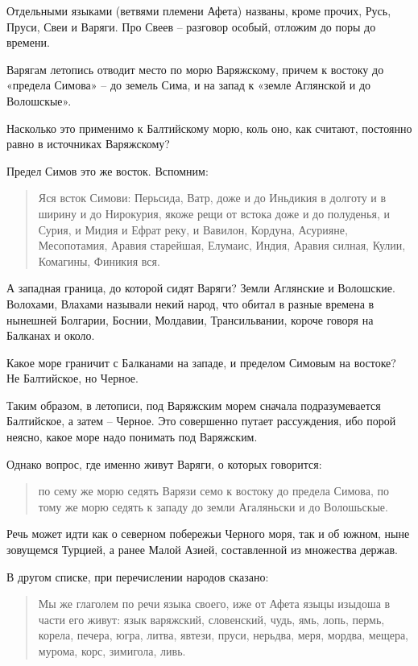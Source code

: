 Отдельными языками (ветвями племени Афета) названы, кроме прочих, Русь, Пруси, Свеи и Варяги. Про Свеев – разговор особый, отложим до поры до времени. 

Варягам летопись отводит место по морю Варяжскому, причем к востоку до «предела Симова» – до земель Сима, и на запад к «земле Аглянской и до Волошскые».

Насколько это применимо к Балтийскому морю, коль оно, как считают, постоянно равно в источниках Варяжскому?

Предел Симов это же восток. Вспомним:

\begin{quotation}
Яся всток Симови: Перьсида, Ватр, доже и до Иньдикия в долготу и в ширину и до Нирокурия, якоже рещи от встока доже и до полуденья, и Сурия, и Мидия и Ефрат реку, и Вавилон, Кордуна, Асурияне, Месопотамия, Аравия старейшая, Елумаис, Индия, Аравия силная, Кулии, Комагины, Финикия вся.
\end{quotation}

А западная граница, до которой сидят Варяги? Земли Аглянские и Волошские. Волохами, Влахами называли некий народ, что обитал в разные времена в нынешней Болгарии, Боснии, Молдавии, Трансильвании, короче говоря на Балканах и около.

Какое море граничит с Балканами на западе, и пределом Симовым на востоке? Не Балтийское, но Черное.

Таким образом, в летописи, под Варяжским морем сначала подразумевается Балтийское, а затем – Черное. Это совершенно путает рассуждения, ибо порой неясно, какое море надо понимать под Варяжским.

Однако вопрос, где именно живут Варяги, о которых говорится:

\begin{quotation}
по сему же морю седять Варязи семо к востоку до предела Симова, по тому же морю седять к западу до земли Агаляньски и до Волошьскые.
\end{quotation}

Речь может идти как о северном побережьи Черного моря, так и об южном, ныне зовущемся Турцией, а ранее Малой Азией, составленной из множества держав.

В другом списке, при перечислении народов сказано:

\begin{quotation}
Мы же глаголем по речи языка своего, иже от Афета языцы изыдоша в части его живут: язык варяжский, словенский, чудь, ямь, лопь, пермь, корела, печера, югра, литва, явтези, пруси, нерьдва, меря, мордва, мещера, мурома, корс, зимигола, ливь. 
\end{quotation}


